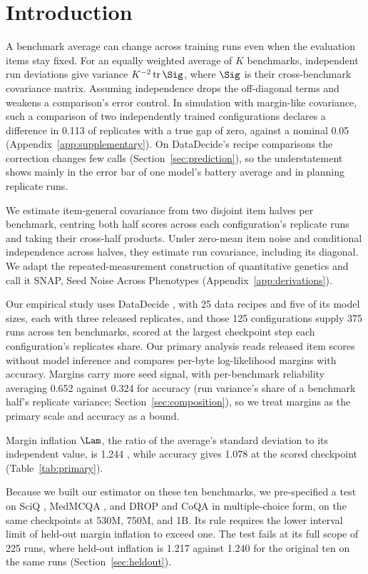 \section{Introduction}
A benchmark average can change across training runs even when the evaluation items stay fixed. For an equally weighted average of $K$ benchmarks, independent run deviations give variance $K^{-2}\operatorname{tr}\Sig$, where $\Sig$ is their cross-benchmark covariance matrix. Assuming independence drops the off-diagonal terms and weakens a comparison's error control. In simulation with margin-like covariance, such a comparison of two independently trained configurations declares a difference in 0.113 of replicates with a true gap of zero, against a nominal 0.05 (Appendix~\ref{app:supplementary}). On DataDecide's recipe comparisons the correction changes few calls (Section~\ref{sec:prediction}), so the understatement shows mainly in the error bar of one model's battery average and in planning replicate runs.

We estimate item-general covariance from two disjoint item halves per benchmark, centring both half scores across each configuration's replicate runs and taking their cross-half products. Under zero-mean item noise and conditional independence across halves, they estimate run covariance, including its diagonal. We adapt the repeated-measurement construction of quantitative genetics and call it SNAP, Seed Noise Across Phenotypes (Appendix~\ref{app:derivations}).

Our empirical study uses DataDecide \citep{magnusson2025}, with 25 data recipes and five of its model sizes, each with three released replicates, and those 125 configurations supply 375 runs across ten benchmarks, scored at the largest checkpoint step each configuration's replicates share. Our primary analysis reads released item scores without model inference and compares per-byte log-likelihood margins with accuracy. Margins carry more seed signal, with per-benchmark reliability averaging 0.652 against 0.324 for accuracy (run variance's share of a benchmark half's replicate variance; Section~\ref{sec:composition}), so we treat margins as the primary scale and accuracy as a bound.

Margin inflation $\Lam$, the ratio of the average's standard deviation to its independent value, is 1.244 , while accuracy gives 1.078  at the scored checkpoint (Table~\ref{tab:primary}).

Because we built our estimator on these ten benchmarks, we pre-specified a test on SciQ \citep{welbl2017sciq}, MedMCQA \citep{pal2022medmcqa}, and DROP \citep{dua2019drop} and CoQA \citep{reddy2019coqa} in multiple-choice form, on the same checkpoints at 530M, 750M, and 1B. Its rule requires the lower interval limit of held-out margin inflation to exceed one. The test fails at its full scope of 225 runs, where held-out inflation is 1.217  against 1.240  for the original ten on the same runs (Section~\ref{sec:heldout}).

